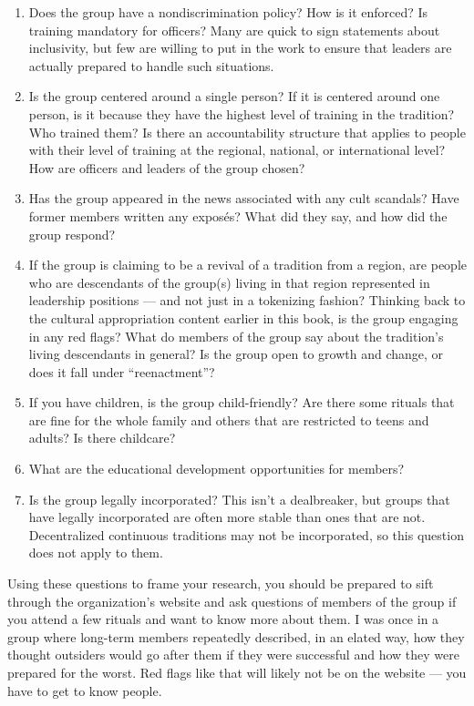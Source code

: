 \documentclass[
]{book}
\providecommand{\tightlist}{%
  \setlength{\itemsep}{0pt}\setlength{\parskip}{0pt}}
\begin{document}
\begin{enumerate}
\def\labelenumi{\arabic{enumi}.}
\tightlist
\item
  Does the group have a nondiscrimination policy? How is it enforced? Is training mandatory for officers? Many are quick to sign statements about inclusivity, but few are willing to put in the work to ensure that leaders are actually prepared to handle such situations.
\item
  Is the group centered around a single person? If it is centered around one person, is it because they have the highest level of training in the tradition? Who trained them? Is there an accountability structure that applies to people with their level of training at the regional, national, or international level? How are officers and leaders of the group chosen?
\item
  Has the group appeared in the news associated with any cult scandals? Have former members written any exposés? What did they say, and how did the group respond?
\item
  If the group is claiming to be a revival of a tradition from a region, are people who are descendants of the group(s) living in that region represented in leadership positions --- and not just in a tokenizing fashion? Thinking back to the cultural appropriation content earlier in this book, is the group engaging in any red flags? What do members of the group say about the tradition's living descendants in general? Is the group open to growth and change, or does it fall under ``reenactment''?
\item
  If you have children, is the group child-friendly? Are there some rituals that are fine for the whole family and others that are restricted to teens and adults? Is there childcare?
\item
  What are the educational development opportunities for members?
\item
  Is the group legally incorporated? This isn't a dealbreaker, but groups that have legally incorporated are often more stable than ones that are not. Decentralized continuous traditions may not be incorporated, so this question does not apply to them.
\end{enumerate}

Using these questions to frame your research, you should be prepared to sift through the organization's website and ask questions of members of the group if you attend a few rituals and want to know more about them. I was once in a group where long-term members repeatedly described, in an elated way, how they thought outsiders would go after them if they were successful and how they were prepared for the worst. Red flags like that will likely not be on the website --- you have to get to know people.
\end{document}
